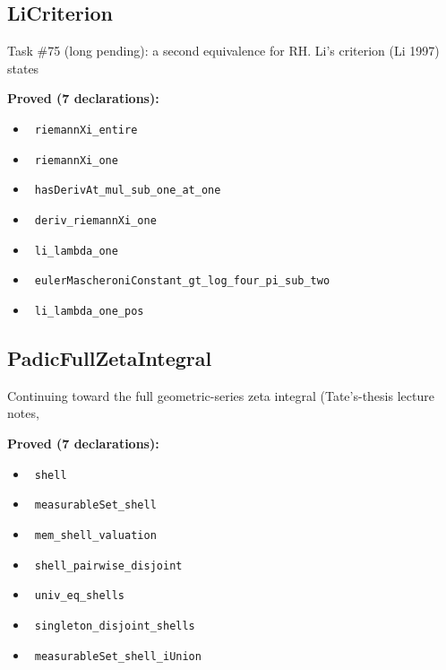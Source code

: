 \documentclass{report}
\theoremstyle{definition}
\begin{document}
\subsection{LiCriterion}
Task \#75 (long pending): a second equivalence for RH. Li's criterion (Li 1997) states

\noindent\textbf{Proved (7 declarations):}
\begin{itemize}
  \item {}\leanok\ \texttt{riemannXi\_entire}
  \item {}\leanok\ \texttt{riemannXi\_one}
  \item {}\leanok\ \texttt{hasDerivAt\_mul\_sub\_one\_at\_one}
  \item {}\leanok\ \texttt{deriv\_riemannXi\_one}
  \item {}\leanok\ \texttt{li\_lambda\_one}
  \item {}\leanok\ \texttt{eulerMascheroniConstant\_gt\_log\_four\_pi\_sub\_two}
  \item {}\leanok\ \texttt{li\_lambda\_one\_pos}
\end{itemize}

\subsection{PadicFullZetaIntegral}
Continuing toward the full geometric-series zeta integral (Tate's-thesis lecture notes,

\noindent\textbf{Proved (7 declarations):}
\begin{itemize}
  \item {}\leanok\ \texttt{shell}
  \item {}\leanok\ \texttt{measurableSet\_shell}
  \item {}\leanok\ \texttt{mem\_shell\_valuation}
  \item {}\leanok\ \texttt{shell\_pairwise\_disjoint}
  \item {}\leanok\ \texttt{univ\_eq\_shells}
  \item {}\leanok\ \texttt{singleton\_disjoint\_shells}
  \item {}\leanok\ \texttt{measurableSet\_shell\_iUnion}
\end{itemize}
\end{document}
